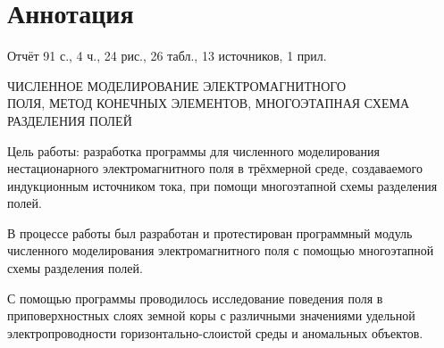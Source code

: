 \chapter*{Аннотация}

Отчёт 91 с., 4 ч., 24 рис., 26 табл., 13 источников, 1 прил.

ЧИСЛЕННОЕ МОДЕЛИРОВАНИЕ ЭЛЕКТРОМАГНИТНОГО \\ ПОЛЯ, МЕТОД КОНЕЧНЫХ ЭЛЕМЕНТОВ, МНОГОЭТАПНАЯ СХЕМА РАЗДЕЛЕНИЯ ПОЛЕЙ

Цель работы: разработка программы для численного моделирования нестационарного электромагнитного поля в трёхмерной среде, создаваемого индукционным источником тока, при помощи многоэтапной схемы разделения полей.

В процессе работы был разработан и протестирован  программный модуль численного моделирования электромагнитного поля с помощью многоэтапной схемы разделения полей.

С помощью программы проводилось исследование поведения поля в приповерхностных слоях земной коры с различными значениями удельной электропроводности горизонтально-слоистой среды и аномальных объектов. 